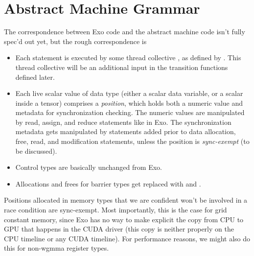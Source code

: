 \newpage
\section{Abstract Machine Grammar}
\label{ch:AbstractMachineGrammar}




\filbreak
{}



\filbreak
{}



\filbreak
{}

The correspondence between Exo code and the abstract machine code isn't fully spec'd out yet, but the rough correspondence is

\begin{itemize}
  \item Each statement is executed by some thread collective , as defined by .
    This thread collective will be an additional input in the transition functions defined later.
  \filbreak
  \item Each live scalar value of data type (either a scalar data variable, or a scalar inside a tensor) comprises a \textit{position},
    which holds both a numeric value and metadata for synchronization checking.
    The numeric values are manipulated by read, assign, and reduce statements like in Exo.
    The synchronization metadata gets manipulated by  statements added prior to data allocation, free, read, and modification statements,
    unless the position is \textit{sync-exempt} (to be discussed).
  \filbreak
  \item Control types are basically unchanged from Exo.
  \filbreak
  \item Allocations and frees for barrier types get replaced with  and .
\end{itemize}

\filbreak
{} Positions allocated in memory types that we are confident won't be involved in a race condition are sync-exempt.
Most importantly, this is the case for grid constant memory, since Exo has no way to make explicit the copy from CPU to GPU that happens in the CUDA driver (this copy is neither properly on the CPU timeline or any CUDA timeline).
For performance reasons, we might also do this for non-wgmma register types.

